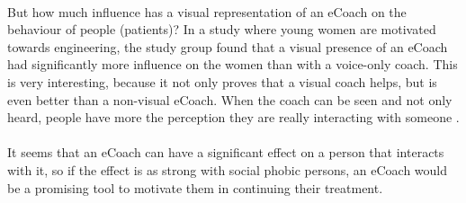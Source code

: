 \documentclass[english,a4paper,pdftex]{report}
\begin{document}
\paragraph{}
But how much influence has a visual representation of an eCoach on the behaviour of people (patients)? In a study \cite{rosenberg2007importance} where young women are motivated towards engineering, the study group found that a visual presence of an eCoach had significantly more influence on the women than with a voice-only coach. This is very interesting, because it not only proves that a visual coach helps, but is even better than a non-visual eCoach. When the coach can be seen and not only heard, people have more the perception they are really interacting with someone \cite{baylor2009promoting}. 
\paragraph{}
It seems that an eCoach can have a significant effect on a person that interacts with it, so if the effect is as strong with social phobic persons, an eCoach would be a promising tool to motivate them in continuing their treatment.
\end{document}
